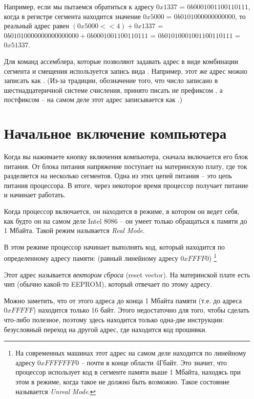 \documentclass[a4page]{article}
\begin{document}
Например, если мы пытаемся обратиться к адресу $0x1337$ = $0b0001001100110111$,
когда в регистре сегмента находится значение $0x5000$ = $0b0101000000000000$,
то реальный адрес равен $(0x5000 << 4) + 0x1337$ = $0b01010000000000000000 + 0b0001001100110111$ = $0b01010001001100110111$ = $0x51337$.

Для команд ассемблера, которые позволяют задавать адрес в виде комбинации сегмента и смещения
используется запись вида .
Например, этот же адрес можно записать как .
(Из-за традиции, обозначение того, что число записано в шестнадцатеричной системе счисления,
принято писать не префиксом , а постфиксом  --
на самом деле этот адрес записывается как .)



\section{Начальное включение компьютера}

Когда вы нажимаете кнопку включения компьютера,
сначала включается его блок питания.
От блока питания напряжение поступает на материнскую плату,
где ток разделяется на несколько сегментов.
Одна из этих цепей питания -- это цепь питания процессора.
В итоге, через некоторое время процессор получает питание и начинает работать.

Когда процессор включается, он находится в режиме,
в котором он ведет себя, как будто он на самом деле Intel 8086 --
он умеет только обращаться к памяти до 1 Мбайта.
Такой режим называется \emph{Real Mode}.

В этом режиме процессор начинает выполнять код, который находится по определенному адресу памяти:
 (равный линейному адресу $0xFFFF0$)
\footnote{На современных машинах этот адрес на самом деле находится по линейному адресу $0xFFFFFFF0$ -- почти в конце области 4Гбайт.
Это значит, что процессор использует код в сегменте памяти выше 1 Мбайта,
находясь при этом в режиме, когда такое не должно быть возможно.
Такое состояние называется \emph{Unreal Mode}.}


Этот адрес называется \emph{вектором сброса} (reset vector).
На материнской плате есть чип (обычно какой-то EEPROM), который отвечает по этому адресу.

Можно заметить, что от этого адреса до конца 1 Мбайта памяти
(т.е. до адреса $0xFFFFF$)
находится только 16 байт.
Этого недостаточно для того, чтобы сделать что-либо полезное,
поэтому здесь находится только одна-две инструкции:
безусловный переход на другой адрес, где находится код прошивки.
\end{document}
